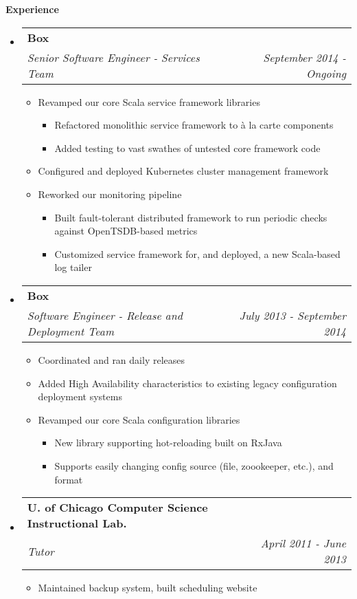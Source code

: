 \documentclass[letterpaper,11pt]{article}
\makeatletter
\newcommand{\resitem}[1]{\item #1 \vspace{-2pt}}
\newcommand{\resheading}[1]{{\large {\textbf{#1 \vphantom{p\^{E}}}}}}
\newcommand{\ressubheading}[4]{
  \begin{tabular*}{6.5in}{l@{\extracolsep{\fill}}r}
    \textbf{#1} & #2 \\
    \textit{#3} & \textit{#4} \\
  \end{tabular*}\vspace{-6pt}}
\makeatother
\begin{document}
\resheading{Experience}
\begin{itemize}
\item[]
  \ressubheading{Box}{}{Senior Software Engineer - Services Team}{September 2014 - Ongoing}
  \begin{itemize}
    \resitem{Revamped our core Scala service framework libraries}
    \begin{itemize}
      \resitem{Refactored monolithic service framework to \`{a} la carte components}
      \resitem{Added testing to vast swathes of untested core framework code}
    \end{itemize}
    \resitem{Configured and deployed Kubernetes cluster management framework}
    \resitem{Reworked our monitoring pipeline}
    \begin{itemize}
      \resitem{Built fault-tolerant distributed framework to run periodic checks against OpenTSDB-based metrics}
      \resitem{Customized service framework for, and deployed, a new Scala-based log tailer}
    \end{itemize}
  \end{itemize}
\item[]
  \ressubheading{Box}{}{Software Engineer - Release and Deployment Team}{July 2013 - September 2014}
  \begin{itemize}
    \resitem{Coordinated and ran daily releases}
    \resitem{Added High Availability characteristics to existing legacy configuration deployment systems}
    \resitem{Revamped our core Scala configuration libraries}
    \begin{itemize}
      \resitem{New library supporting hot-reloading built on RxJava}
      \resitem{Supports easily changing config source (file, zoookeeper, etc.), and format}
    \end{itemize}
  \end{itemize}
\item[]
  \ressubheading{U. of Chicago Computer Science Instructional Lab.}{}{Tutor}{April 2011 - June 2013}
  \begin{itemize}
    \resitem{Maintained backup system, built scheduling website}
  \end{itemize}
  
\end{itemize}
\end{document}
